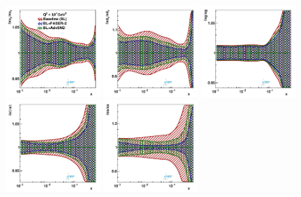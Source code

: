 \begin{figure}[htbp]
\centering
\includegraphics[width=0.32\textwidth]{plots/proton_fasernu2/FASERv2_vs_AdvSND/statOnly_AdvSND_q2_10000_pdf_uv_ratio.pdf}
\includegraphics[width=0.32\textwidth]{plots/proton_fasernu2/FASERv2_vs_AdvSND/statOnly_AdvSND_q2_10000_pdf_dv_ratio.pdf}
\includegraphics[width=0.32\textwidth]{plots/proton_fasernu2/FASERv2_vs_AdvSND/statOnly_AdvSND_q2_10000_pdf_g_ratio.pdf}\\
\includegraphics[width=0.32\textwidth]{plots/proton_fasernu2/FASERv2_vs_AdvSND/statOnly_AdvSND_q2_10000_pdf_Sea_ratio.pdf}
\includegraphics[width=0.32\textwidth]{plots/proton_fasernu2/FASERv2_vs_AdvSND/statOnly_AdvSND_q2_10000_pdf_s_ratio.pdf}\\

\end{figure}
